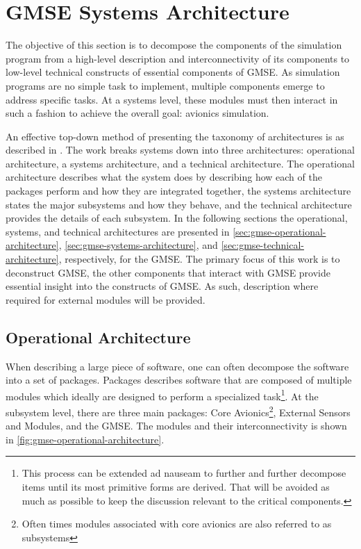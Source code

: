 \section{GMSE Systems Architecture}

The objective of this section is to decompose the components of the simulation program from a high-level description and
interconnectivity of its components to low-level technical constructs of essential components of GMSE. As simulation
programs are no simple task to implement, multiple components emerge to address specific tasks. At a systems level,
these modules must then interact in such a fashion to achieve the overall goal: avionics simulation.

An effective top-down method of presenting the taxonomy of architectures is as described in \cite{levis_c4isr_2000}. The
work breaks systems down into three architectures: operational architecture, a systems architecture, and a technical
architecture. The operational architecture describes what the system does by describing how each of the packages perform
and how they are integrated together, the systems architecture states the major subsystems and how they behave, and the
technical architecture provides the details of each subsystem. In the following sections the operational, systems, and
technical architectures are presented in \autoref{sec:gmse-operational-architecture},
\autoref{sec:gmse-systems-architecture}, and \autoref{sec:gmse-technical-architecture}, respectively, for the GMSE. The
primary focus of this work is to deconstruct GMSE, the other components that interact with GMSE provide essential
insight into the constructs of GMSE. As such, description where required for external modules will be provided.

\subsection{Operational Architecture}
\label{sec:gmse-operational-architecture}

When describing a large piece of software, one can often decompose the software into a set of packages. Packages
describes software that are composed of multiple modules which ideally are designed to perform a specialized
task\footnote{This process can be extended ad nauseam to further and further decompose items until its most primitive
forms are derived. That will be avoided as much as possible to keep the discussion relevant to the critical
components.}. At the subsystem level, there are three main packages: Core Avionics\footnote{Often times modules
associated with core avionics are also referred to as subsystems}, External Sensors and Modules, and the GMSE. The
modules and their interconnectivity is shown in \autoref{fig:gmse-operational-architecture}.

